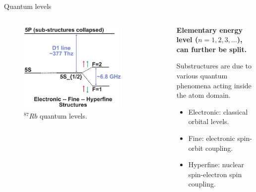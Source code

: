 \begin{frame}{Quantum levels}

    \begin{columns}[c, onlytextwidth]

        \begin{column}{0.45\textwidth}

            \begin{figure}
                \centering
                \includegraphics[width=0.8\textwidth]{pdf/structure-collapsed.pdf}
                \caption{$^{87}Rb$ quantum levels.}
            \end{figure}

        \end{column}

        \begin{column}{0.55\textwidth}

            \textbf{Elementary energy level ($n=1,2,3,\ldots$), can further be split.\footnotemark[1]}

            \vspace{10pt}

            Substructures are due to various quantum phenomena acting inside the atom domain.

            \begin{itemize}
                \item Electronic: classical orbital levels.
                \item Fine: electronic spin-orbit coupling.
                \item Hyperfine: \textcolor[HTML]{FF0000}{nuclear spin}-\textcolor[HTML]{00ED00}{electron spin} coupling.
            \end{itemize}

        \end{column}

    \end{columns}

    \vspace{10pt}


\end{frame}



